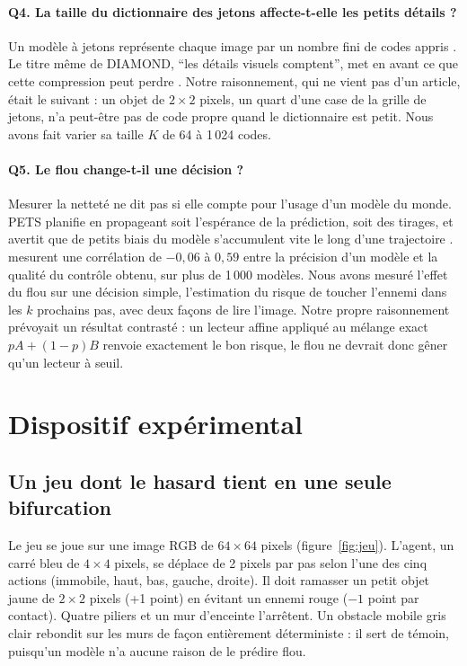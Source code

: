 \documentclass[a4paper, 11pt]{article}
\newcommand{\Q}[1]{\textbf{Q#1}}
\begin{document}
\paragraph{\Q4. La taille du dictionnaire des jetons affecte-t-elle les petits détails ?}
Un modèle à jetons représente chaque image par un nombre fini de codes appris \parencite{vandenoord2017vqvae}. Le titre
même de DIAMOND, \enquote{les détails visuels comptent}, met en avant ce que cette compression peut perdre
\parencite{alonso2024diamond}. Notre raisonnement, qui ne vient pas d'un article, était le suivant : un objet de
$2\times2$ pixels, un quart d'une case de la grille de jetons, n'a peut-être pas de code propre quand le dictionnaire est
petit. Nous avons fait varier sa taille $K$ de 64 à 1\,024 codes.

\paragraph{\Q5. Le flou change-t-il une décision ?}
Mesurer la netteté ne dit pas si elle compte pour l'usage d'un modèle du monde. PETS planifie en propageant soit
l'espérance de la prédiction, soit des tirages, et avertit que de petits biais du modèle s'accumulent vite le long d'une
trajectoire \parencite[§5.2]{chua2018pets}. \textcite[§4.1]{lambert2020objective} mesurent une corrélation de $-0{,}06$ à
$0{,}59$ entre la précision d'un modèle et la qualité du contrôle obtenu, sur plus de 1\,000 modèles. Nous avons mesuré l'effet du flou sur une décision simple, l'estimation du risque de toucher l'ennemi dans les $k$ prochains pas, avec
deux façons de lire l'image. Notre propre raisonnement prévoyait un résultat contrasté : un lecteur affine appliqué au
mélange exact $pA + (1-p)B$ renvoie exactement le bon risque, le flou ne devrait donc gêner qu'un lecteur à seuil.

\section{Dispositif expérimental}\label{sec:dispositif}

\subsection{Un jeu dont le hasard tient en une seule bifurcation}

Le jeu se joue sur une image RGB de $64\times64$ pixels (figure~\ref{fig:jeu}). L'agent, un carré bleu de $4\times4$
pixels, se déplace de 2 pixels par pas selon l'une des cinq actions (immobile, haut, bas, gauche, droite). Il doit ramasser
un petit objet jaune de $2\times2$ pixels (+1 point) en évitant un ennemi rouge ($-1$ point par contact). Quatre piliers et un
mur d'enceinte l'arrêtent. Un obstacle mobile gris clair rebondit sur les murs de façon entièrement déterministe : il sert
de témoin, puisqu'un modèle n'a aucune raison de le prédire flou.
\end{document}
